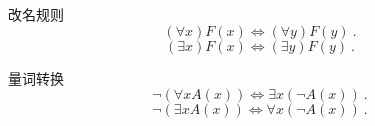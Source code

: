 
\begin{theorem}{改名规则}
\begin{equation}
(\forall x) F(x) \Leftrightarrow (\forall y) F(y) ~.
\end{equation}
\begin{equation}
(\exists x) F(x) \Leftrightarrow (\exists y) F(y) ~.
\end{equation}
\end{theorem}
\begin{theorem}{量词转换}
\begin{equation}
\neg (\forall x A(x)) \Leftrightarrow \exists x (\neg A(x)) ~.
\end{equation}
\begin{equation}
\neg (\exists x A(x)) \Leftrightarrow \forall x (\neg A(x)) ~.
\end{equation}

\end{theorem}

